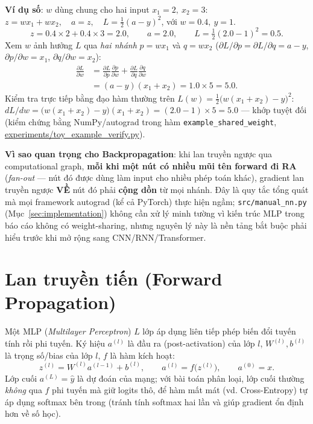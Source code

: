 \documentclass[12pt,a4paper]{article}
\newcommand{\en}[1]{\textit{#1}}
\begin{document}
\textbf{Ví dụ số}: $w$ dùng chung cho hai input $x_1=2,\ x_2=3$:
$z = w x_1 + w x_2,\quad a=z,\quad L=\tfrac12(a-y)^2$, với $w=0.4,\ y=1$.
$$z = 0.4\times2 + 0.4\times3 = 2.0,\qquad a=2.0,\qquad L=\tfrac12(2.0-1)^2=0.5.$$
Xem $w$ ảnh hưởng $L$ qua \emph{hai nhánh} $p=wx_1$ và $q=wx_2$
($\partial L/\partial p=\partial L/\partial q=a-y$, $\partial p/\partial w=x_1$,
$\partial q/\partial w=x_2$):
\begin{align*}
\frac{\partial L}{\partial w} &= \frac{\partial L}{\partial p}\frac{\partial p}{\partial w} + \frac{\partial L}{\partial q}\frac{\partial q}{\partial w}\\
&= (a-y)(x_1+x_2) = 1.0\times5 = 5.0.
\end{align*}
Kiểm tra trực tiếp bằng đạo hàm thường trên $L(w)=\tfrac12\big(w(x_1{+}x_2)-y\big)^2$:
$dL/dw = \big(w(x_1{+}x_2)-y\big)(x_1{+}x_2) = (2.0-1)\times5=5.0$ --- khớp
tuyệt đối (kiểm chứng bằng NumPy/autograd trong hàm
\texttt{example\_shared\_weight}, \url{experiments/toy_example_verify.py}).

\textbf{Vì sao quan trọng cho Backpropagation}: khi lan truyền ngược qua
computational graph, \textbf{mỗi khi một nút có nhiều mũi tên forward đi
RA} (\en{fan-out} --- nút đó được dùng làm input cho nhiều phép toán
khác), gradient lan truyền ngược \textbf{VỀ} nút đó phải \textbf{cộng dồn}
từ mọi nhánh. Đây là quy tắc tổng quát mà mọi framework autograd (kể cả
PyTorch) thực hiện ngầm; \texttt{src/manual\_nn.py} (Mục~\ref{sec:implementation})
không cần xử lý minh tường vì kiến trúc MLP trong báo cáo không có
weight-sharing, nhưng nguyên lý này là nền tảng bắt buộc phải hiểu trước
khi mở rộng sang CNN/RNN/Transformer.

\section{Lan truyền tiến (Forward Propagation)}
\label{sec:forward}

Một MLP (\en{Multilayer Perceptron}) $L$ lớp áp dụng liên tiếp phép biến
đổi tuyến tính rồi phi tuyến. Ký hiệu $a^{(l)}$ là đầu ra (post-activation)
của lớp $l$, $W^{(l)},b^{(l)}$ là trọng số/bias của lớp $l$, $f$ là hàm
kích hoạt:
$$z^{(l)} = W^{(l)}a^{(l-1)} + b^{(l)}, \qquad a^{(l)} = f\big(z^{(l)}\big), \qquad a^{(0)}=x.$$
Lớp cuối $a^{(L)}=\hat y$ là dự đoán của mạng; với bài toán phân loại, lớp
cuối thường \emph{không} qua $f$ phi tuyến mà giữ logits thô, để hàm mất
mát (vd. Cross-Entropy) tự áp dụng softmax bên trong (tránh tính softmax
hai lần và giúp gradient ổn định hơn về số học).
\end{document}
